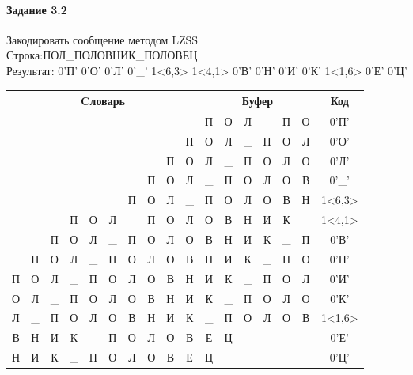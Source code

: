 \documentclass[a4paper, 12pt]{article}
\begin{document}
\paragraph{Задание 3.2}

Закодировать сообщение методом LZSS\\
Строка:ПОЛ\_ПОЛОВНИК\_ПОЛОВЕЦ\\
Результат: 0'П' 0'О' 0'Л' 0'\_' 1<6,3> 1<4,1> 0'В' 0'Н' 0'И' 0'К' 1<1,6> 0'Е' 0'Ц'\\
\begin{table}[h!]
\centering
\begin{tabular}{|c|c|c|c|c|c|c|c|c|c|c|c|c|c|c|c|c|}
\hline
\multicolumn{10}{|c|}{Cловарь} & \multicolumn{6}{c|}{Буфер} & Код  \\ \hline
  &   &   &   &   &   &   &   &   &   & П & О & Л & \_ & П & О & 0'П'\\ \hline
  &   &   &   &   &   &   &   &   & П & О & Л & \_ & П & О & Л & 0'О'\\ \hline
  &   &   &   &   &   &   &   & П & О & Л & \_ & П & О & Л & О & 0'Л'\\ \hline
  &   &   &   &   &   &   & П & О & Л & \_ & П & О & Л & О & В & 0'\_'\\ \hline
  &   &   &   &   &   & \cellcolor[HTML]{FFFF00} П & \cellcolor[HTML]{FFFF00} О & \cellcolor[HTML]{FFFF00} Л & \_ & \cellcolor[HTML]{FFFF00} П & \cellcolor[HTML]{FFFF00} О & \cellcolor[HTML]{FFFF00} Л & О & В & Н & 1<6,3>\\ \hline
  &   &   & П & \cellcolor[HTML]{FFFF00} О & Л & \_ & П & О & Л & \cellcolor[HTML]{FFFF00} О & В & Н & И & К & \_ & 1<4,1>\\ \hline
  &   & П & О & Л & \_ & П & О & Л & О & В & Н & И & К & \_ & П & 0'В'\\ \hline
  & П & О & Л & \_ & П & О & Л & О & В & Н & И & К & \_ & П & О & 0'Н'\\ \hline
П & О & Л & \_ & П & О & Л & О & В & Н & И & К & \_ & П & О & Л & 0'И'\\ \hline
О & Л & \_ & П & О & Л & О & В & Н & И & К & \_ & П & О & Л & О & 0'К'\\ \hline
Л & \cellcolor[HTML]{FFFF00} \_ & \cellcolor[HTML]{FFFF00} П & \cellcolor[HTML]{FFFF00} О & \cellcolor[HTML]{FFFF00} Л & \cellcolor[HTML]{FFFF00} О & \cellcolor[HTML]{FFFF00} В & Н & И & К & \cellcolor[HTML]{FFFF00} \_ & \cellcolor[HTML]{FFFF00} П & \cellcolor[HTML]{FFFF00} О & \cellcolor[HTML]{FFFF00} Л & \cellcolor[HTML]{FFFF00} О & \cellcolor[HTML]{FFFF00} В & 1<1,6>\\ \hline
В & Н & И & К & \_ & П & О & Л & О & В & Е & Ц &   &   &   &   & 0'Е'\\ \hline
Н & И & К & \_ & П & О & Л & О & В & Е & Ц &   &   &   &   &   & 0'Ц'\\ \hline
\end{tabular}
\end{table}
\end{document}
